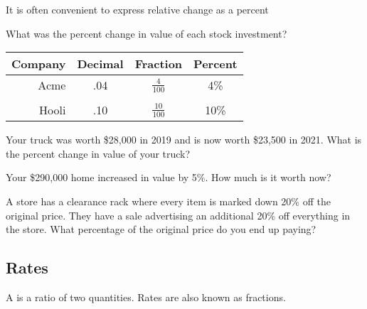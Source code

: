 It is often convenient to express relative change as a percent
\begin{example}
  What was the percent change in value of each stock investment?
  \begin{center}
    \begin{tabular}{rccc}
      \toprule
      Company & Decimal & Fraction & Percent \\
      \midrule
      Acme & .04 & \(\frac{4}{100}\) & 4\% \\ \\
      Hooli & .10 & \(\frac{10}{100}\) & 10\% \\
      \bottomrule
    \end{tabular}
\end{center}
\end{example}

\newpage

\begin{exercise}
  Your truck was worth \$28,000 in 2019 and is now worth \$23,500 in
  2021. What is the percent change in value of your truck?

\end{exercise}


\begin{exercise}
  Your \$290,000 home increased in value by 5\%. How much is it worth now?

\end{exercise}

\begin{exercise}
  A store has a clearance rack where every item is marked down 20\%
  off the original price. They have a sale advertising an additional
  20\% off everything in the store. What percentage of the original
  price do you end up paying?

\end{exercise}

\newpage

\subsection{Rates}
\label{sub:rates}

\begin{definition}
  A  is a ratio of two quantities. Rates are also known as
  fractions.
\end{definition}

